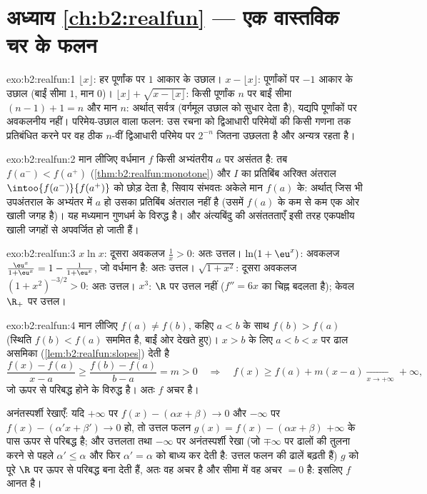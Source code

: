 \section*{अध्याय \ref{ch:b2:realfun} --- एक वास्तविक चर के फलन}

\begin{solution}{exo:b2:realfun:1}
$\lfloor x\rfloor$: हर पूर्णांक पर $1$ आकार के उछाल। $x -
\lfloor x\rfloor$: पूर्णांकों पर $-1$ आकार के
उछाल (बाईं सीमा $1$, मान $0$)। $\lfloor x\rfloor + \sqrt{x - \lfloor x\rfloor}$: किसी पूर्णांक $n$ पर बाईं सीमा $(n - 1) + 1 = n$
और मान $n$: अर्थात् सर्वत्र \emph{} (वर्गमूल उछाल को सुधार देता है),
यद्यपि पूर्णांकों पर अवकलनीय नहीं। परिमेय-उछाल वाला फलन: उस रचना को
द्विआधारी परिमेयों की किसी गणना तक प्रतिबंधित करने पर वह ठीक $n$-वीं
द्विआधारी परिमेय पर $2^{-n}$ जितना उछलता है और अन्यत्र  रहता है।
\end{solution}

\begin{solution}{exo:b2:realfun:2}
मान लीजिए वर्धमान $f$ किसी अभ्यंतरीय $a$ पर असंतत है: तब $f(a^-) < f(a^+)$ (\cref{thm:b2:realfun:monotone}) और
$I$ का प्रतिबिंब अरिक्त  अंतराल $\intoo{f(a^-)}{f(a^+)}$ को छोड़ देता है, सिवाय संभवतः
अकेले मान $f(a)$ के: अर्थात् जिस भी उपअंतराल के अभ्यंतर में $a$ हो उसका
प्रतिबिंब अंतराल नहीं है (उसमें $f(a)$ के कम से कम एक ओर खाली जगह है)। यह
मध्यमान गुणधर्म के विरुद्ध है। और अंत्यबिंदु की असंततताएँ इसी तरह
एकपक्षीय खाली जगहों से अपवर्जित हो जाती हैं।
\end{solution}

\begin{solution}{exo:b2:realfun:3}
$x\ln x$: दूसरा अवकलज $\frac1x > 0$: अतः उत्तल। $\ln(1 +
\eu^x)$: अवकलज $\frac{\eu^x}{1 + \eu^x} = 1 - \frac{1}{1 +
\eu^x}$, जो वर्धमान है: अतः
उत्तल। $\sqrt{1 + x^2}$: दूसरा अवकलज $(1 + x^2)^{-3/2} > 0$: अतः उत्तल। $x^3$: $\R$ पर उत्तल नहीं ($f'' =
6x$ का
चिह्न बदलता है); केवल $\R_+$ पर उत्तल।
\end{solution}

\begin{solution}{exo:b2:realfun:4}
मान लीजिए $f(a) \neq f(b)$, कहिए $a < b$ के साथ $f(b) > f(a)$ (स्थिति $f(b) < f(a)$ सममित है, बाईं ओर
देखते हुए)। $x > b$ के लिए $a < b < x$ पर ढाल असमिका (\cref{lem:b2:realfun:slopes}) देती है
\[
\frac{f(x) - f(a)}{x - a} \geq \frac{f(b) - f(a)}{b - a} = m > 0
\quad\Longrightarrow\quad
f(x) \geq f(a) + m(x - a) \xrightarrow[x\to+\infty]{} +\infty,
\]
जो ऊपर से परिबद्ध होने के विरुद्ध है। अतः $f$ अचर है।

अनंतस्पर्शी रेखाएँ: यदि $+\infty$ पर $f(x) - (\alpha x + \beta) \to 0$ और $-\infty$ पर $f(x) - (\alpha' x + \beta') \to 0$ हो, तो उत्तल फलन $g(x) = f(x) - (\alpha x + \beta)$
$+\infty$ के पास ऊपर से परिबद्ध है; और उत्तलता तथा $-\infty$ पर अनंतस्पर्शी रेखा
(जो $\mp\infty$ पर ढालों की तुलना करने से पहले $\alpha' \leq \alpha$ और फिर $\alpha' = \alpha$ को बाध्य कर देती
है: उत्तल फलन की ढालें बढ़ती हैं) $g$ को पूरे $\R$ पर ऊपर से परिबद्ध बना
देती हैं, अतः वह अचर है और सीमा में वह अचर $= 0$ है: इसलिए $f$ आनत है।
\end{solution}

